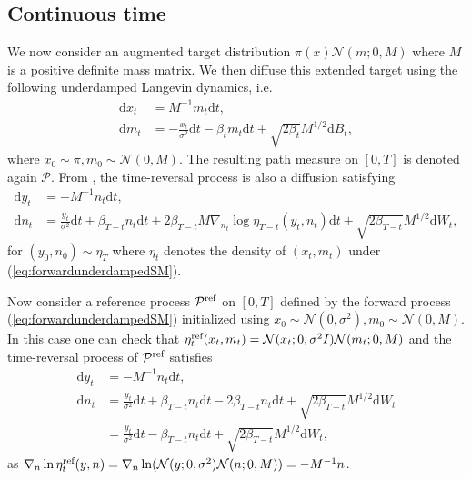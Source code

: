 \documentclass{article} %
\begin{document}
\subsection{Continuous time}
We now consider an augmented target distribution $\pi(x) \mathcal{N}(m;0,M)$ where $M$ is a positive definite mass matrix. We then diffuse this extended target using the following underdamped Langevin dynamics, i.e.
\begin{align}\label{eq:forwardunderdampedSM}
\mathrm{d}x_t&=M^{-1}m_t\mathrm{d}t,\\
\mathrm{d}m_t&=-\frac{x_t}{\sigma^2}\mathrm{d}t -\beta_t m_t\mathrm{d}t +\sqrt{2\beta_t}M^{1/2}\mathrm{d}B_t,\nonumber
\end{align}
where $x_0 \sim \pi, m_0\sim \mathcal{N}(0,M)$. The resulting path measure on $[0,T]$ is denoted again $\mathcal{P}$.
From \citep{haussmann1986time}, the time-reversal process is also a diffusion satisfying
\begin{align}\label{eq:reverseunderdampedSM}
\mathrm{d}y_t&=-M^{-1}n_t\mathrm{d}t,\\
\mathrm{d}n_t&=\frac{y_t}{\sigma^2}\mathrm{d}t + \beta_{T-t} n_t\mathrm{d}t +2\beta_{T-t}M \nabla_{n_t} \log \eta_{T-t}(y_t,n_t)\mathrm{d}t+\sqrt{2\beta_{T-t}}M^{1/2}\mathrm{d}W_t,\nonumber
\end{align}
for $(y_0,n_0) \sim \eta_T$ where $\eta_t$ denotes the density of $(x_t,m_t)$ under (\ref{eq:forwardunderdampedSM}). 

Now consider a reference process $\mathcal{P}^{\textup{ref}}$ on $[0,T]$ defined by the forward process (\ref{eq:forwardunderdampedSM}) initialized using $x_0 \sim \mathcal{N}(0,\sigma^2), m_0\sim \mathcal{N}(0,M)$. In this case one can check that $\eta^{\textup{ref}}_t(x_t,m_t)=\mathcal{N}(x_t;0,\sigma^2I)\mathcal{N}(m_t;0,M)$ and the time-reversal process of $\mathcal{P}^{\textup{ref}}$ satisfies
\begin{align}\label{eq:reverseunderdampedrefSM}
\mathrm{d}y_t&=-M^{-1}n_t\mathrm{d}t,\\
\mathrm{d}n_t&=\frac{y_t}{\sigma^2}\mathrm{d}t + \beta_{T-t} n_t\mathrm{d}t - 2\beta_{T-t} n_t\mathrm{d}t+\sqrt{2\beta_{T-t}}M^{1/2}\mathrm{d}W_t \nonumber\\
&=\frac{y_t}{\sigma^2}\mathrm{d}t -\beta_{T-t} n_t\mathrm{d}t+\sqrt{2\beta_{T-t}}M^{1/2}\mathrm{d}W_t, \nonumber
\end{align}
as $\nabla_n \log \eta_t^{\textup{ref}}(y,n) =\nabla_n \log  (\mathcal{N}(y;0,\sigma^2)\mathcal{N}(n;0,M))=-M^{-1}n$. 
\end{document}
